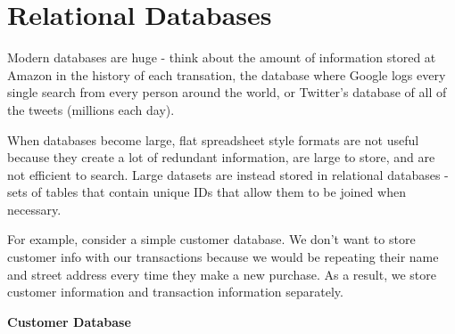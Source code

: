 \documentclass[]{book}
\theoremstyle{definition}
\theoremstyle{definition}
\theoremstyle{definition}
\theoremstyle{remark}
\begin{document}
\hypertarget{relational-databases}{%
\section{Relational Databases}\label{relational-databases}}

Modern databases are huge - think about the amount of information stored
at Amazon in the history of each transation, the database where Google
logs every single search from every person around the world, or
Twitter's database of all of the tweets (millions each day).

When databases become large, flat spreadsheet style formats are not
useful because they create a lot of redundant information, are large to
store, and are not efficient to search. Large datasets are instead
stored in relational databases - sets of tables that contain unique IDs
that allow them to be joined when necessary.

For example, consider a simple customer database. We don't want to store
customer info with our transactions because we would be repeating their
name and street address every time they make a new purchase. As a
result, we store customer information and transaction information
separately.

\textbf{Customer Database}
\end{document}
